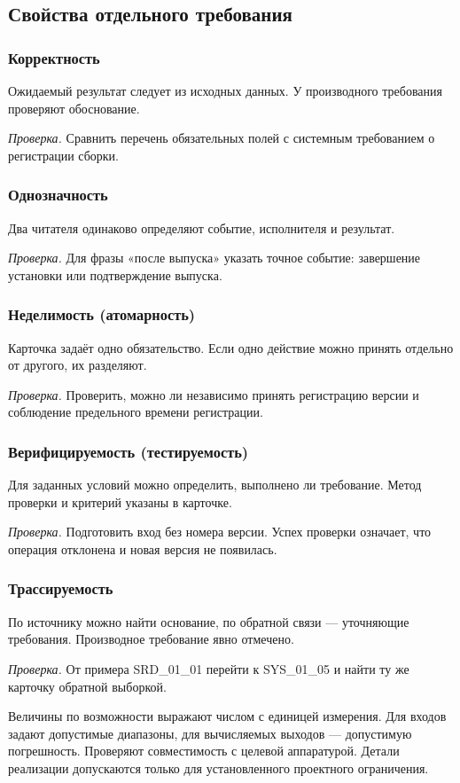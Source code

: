 \documentclass{tpks}
\begin{document}
\subsection{Свойства отдельного требования}

\subsubsection{Корректность}
Ожидаемый результат следует из исходных данных. У производного требования проверяют обоснование.

\textit{Проверка.} Сравнить перечень обязательных полей с системным требованием о регистрации сборки.
\subsubsection{Однозначность}
Два читателя одинаково определяют событие, исполнителя и результат.

\textit{Проверка.} Для фразы «после выпуска» указать точное событие: завершение установки или подтверждение выпуска.
\subsubsection{Неделимость (атомарность)}
Карточка задаёт одно обязательство. Если одно действие можно принять отдельно от другого, их разделяют.

\textit{Проверка.} Проверить, можно ли независимо принять регистрацию версии и соблюдение предельного времени регистрации.
\subsubsection{Верифицируемость (тестируемость)}
Для заданных условий можно определить, выполнено ли требование. Метод проверки и критерий указаны в карточке.

\textit{Проверка.} Подготовить вход без номера версии. Успех проверки означает, что операция отклонена и новая версия не появилась.
\subsubsection{Трассируемость}
По источнику можно найти основание, по обратной связи --- уточняющие требования. Производное требование явно отмечено.

\textit{Проверка.} От примера SRD_01_01 перейти к SYS_01_05 и найти ту же карточку обратной выборкой.

Величины по возможности выражают числом с единицей измерения. Для входов задают допустимые диапазоны, для вычисляемых выходов --- допустимую погрешность. Проверяют совместимость с целевой аппаратурой. Детали реализации допускаются только для установленного проектного ограничения.
\end{document}
